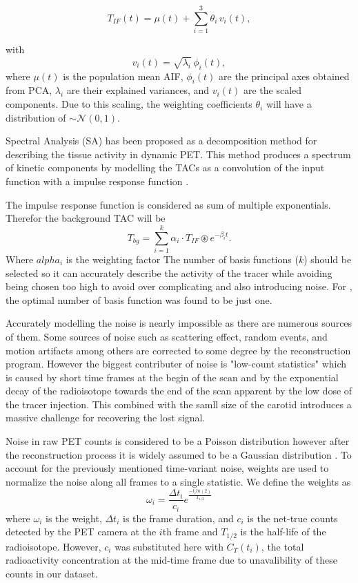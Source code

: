 \begin{equation}
	T_{IF}(t) = \mu(t) + \sum_{i=1}^3 \theta_i\,v_i(t),
\end{equation}

with
\[
	v_i(t) = \sqrt{\lambda_i}\,\phi_i(t),
\]
where \(\mu(t)\) is the population mean AIF, \(\phi_i(t)\) are the principal axes obtained from PCA, \(\lambda_i\) are their explained variances, and \(v_i(t)\) are the scaled components. Due to this scaling, the weighting coefficients \(\theta_i\) will have a distribution of \(\sim \mathcal{N}(0,1)\).

Spectral Analysis (SA) has been proposed as a decomposition method for describing the tissue activity in dynamic PET.
This method produces a spectrum of kinetic components by modelling the TACs as a convolution of the input function with a impulse response function \cite{TODO}.

The impulse response function is considered as sum of multiple exponentials. Therefor the background TAC will be
\[
	T_{bg} = \sum_{i=1}^k \alpha_{i} \cdot T_{IF} \circledast e^{-\beta_{i} t}.
\]
Where \(alpha_i\) is the weighting factor
The number of basis functions (\(k\)) should be selected so it can accurately describe the activity of the tracer while avoiding being chosen too high to avoid over complicating and also introducing noise.
For \fdg, the optimal number of basis function was found to be just one.


Accurately modelling the noise is nearly impossible as there are numerous sources of them.
Some sources of noise such as scattering effect, random events, and motion artifacts among others are corrected to some degree by the reconstruction program.
However the biggest contributer of noise is "low-count statistics" which is caused by short time frames at the begin of the scan and by the exponential decay of the radioisotope towards the end of the scan apparent by the low dose of the tracer injection.
This combined with the samll size of the carotid introduces a massive challenge for recovering the lost signal.

Noise in raw PET counts is considered to be a Poisson distribution however after the reconstruction process it is widely assumed to be a Gaussian distribution \cite{TODO}. To account for the previously mentioned time-variant noise, weights are used to normalize the noise along all frames to a single statistic. We define the weights as
\[
	\omega_{i} = \frac{\Delta t_i}{c_i} e^{\frac{-t_{i} ln(2)}{T_{1/2}}}
\]
where \(\omega_i\) is the weight, \(\Delta t_i\) is the frame duration, and \(c_i\) is the net-true counts detected by the PET camera at the \(i\)th frame and  \(T_{1/2}\) is the half-life of the radioisotope.
However, \(c_i\) was substituted here with \(C_T(t_i)\), the total radioactivity concentration at the mid-time frame due to unavalibility of these counts in our dataset.


